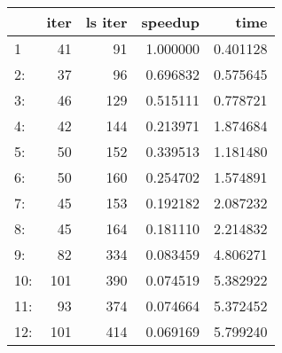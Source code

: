 \begin{tabular}{lrrrr}
\toprule
{} &  iter &  ls iter &   speedup &      time \\
\midrule
1   &    41 &       91 &  1.000000 &  0.401128 \\
2:  &    37 &       96 &  0.696832 &  0.575645 \\
3:  &    46 &      129 &  0.515111 &  0.778721 \\
4:  &    42 &      144 &  0.213971 &  1.874684 \\
5:  &    50 &      152 &  0.339513 &  1.181480 \\
6:  &    50 &      160 &  0.254702 &  1.574891 \\
7:  &    45 &      153 &  0.192182 &  2.087232 \\
8:  &    45 &      164 &  0.181110 &  2.214832 \\
9:  &    82 &      334 &  0.083459 &  4.806271 \\
10: &   101 &      390 &  0.074519 &  5.382922 \\
11: &    93 &      374 &  0.074664 &  5.372452 \\
12: &   101 &      414 &  0.069169 &  5.799240 \\
\bottomrule
\end{tabular}
